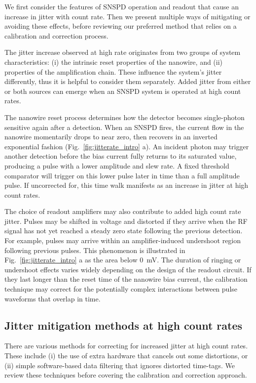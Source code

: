 \documentclass[11pt]{caltech_thesis} %
\begin{document}
We first consider the features of SNSPD operation and readout that cause an increase in jitter with count rate. Then we present multiple ways of mitigating or avoiding these effects, before reviewing our preferred method that relies on a calibration and correction process.

The jitter increase observed at high rate originates from two groups of system characteristics: (i) the intrinsic reset properties of the nanowire, and (ii) properties of the amplification chain. These influence the system's jitter differently, thus it is helpful to consider them separately. Added jitter from either or both sources can emerge when an SNSPD system is operated at high count rates.

The nanowire reset process determines how the detector becomes single-photon sensitive again after a detection. When an SNSPD fires, the current flow in the nanowire momentarily drops to near zero, then recovers in an inverted exponential fashion (Fig.~\ref{fig:jitterate_intro} a). An incident photon may trigger another detection before the bias current fully returns to its saturated value, producing a pulse with a lower amplitude and slew rate. A fixed threshold comparator will trigger on this lower pulse later in time than a full amplitude pulse. If uncorrected for, this time walk manifests as an increase in jitter at high count rates.

The choice of readout amplifiers may also contribute to added high count rate jitter. Pulses may be shifted in voltage and distorted if they arrive when the RF signal has not yet reached a steady zero state following the previous detection. For example, pulses may arrive within an amplifier-induced undershoot region following previous pulses. This phenomenon is illustrated in Fig.~\ref{fig:jitterate_intro} a as the area below 0~mV. The duration of ringing or undershoot effects varies widely depending on the design of the readout circuit. If they last longer than the reset time of the nanowire bias current, the calibration technique may correct for the potentially complex interactions between pulse waveforms that overlap in time.

\hypertarget{jitter-mitigation-methods-at-high-count-rates}{%
\subsection{Jitter mitigation methods at high count rates}\label{jitter-mitigation-methods-at-high-count-rates}}

There are various methods for correcting for increased jitter at high count rates. These include (i) the use of extra hardware that cancels out some distortions, or (ii) simple software-based data filtering that ignores distorted time-tags. We review these techniques before covering the calibration and correction approach.
\end{document}
